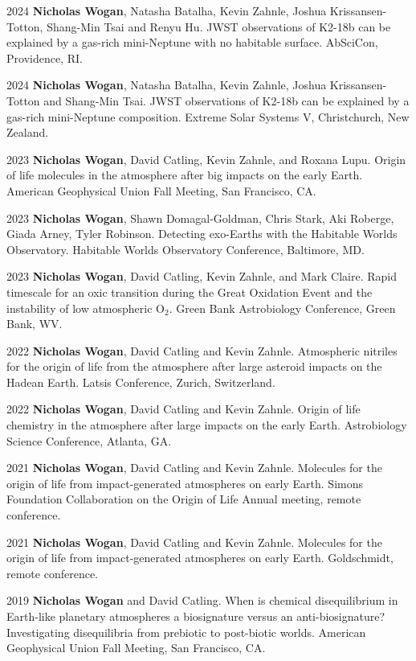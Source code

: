 \documentclass{article}
\begin{document}
\begin{cvlist}
\item[2024]
  \textbf{Nicholas Wogan}, Natasha Batalha, Kevin Zahnle, Joshua Krissansen-Totton, Shang-Min Tsai and Renyu Hu. JWST observations of K2-18b can be explained by a gas-rich mini-Neptune with no habitable surface. AbSciCon, Providence, RI.
\item[2024]
  \textbf{Nicholas Wogan}, Natasha Batalha, Kevin Zahnle, Joshua Krissansen-Totton and Shang-Min Tsai. JWST observations of K2-18b can be explained by a gas-rich mini-Neptune composition. Extreme Solar Systems V, Christchurch, New Zealand.
\item[2023]
  \textbf{Nicholas Wogan}, David Catling, Kevin Zahnle, and Roxana Lupu. Origin of life molecules in the atmosphere after big impacts on the early Earth. American Geophysical Union Fall Meeting, San Francisco, CA.
\item[2023]
  \textbf{Nicholas Wogan}, Shawn Domagal-Goldman, Chris Stark, Aki Roberge, Giada Arney, Tyler Robinson. Detecting exo-Earths with the Habitable Worlds Observatory. Habitable Worlds Observatory Conference, Baltimore, MD.
\item[2023]
  \textbf{Nicholas Wogan}, David Catling, Kevin Zahnle, and Mark Claire. Rapid timescale for an oxic transition during the Great Oxidation Event and the instability of low atmospheric O$_2$. Green Bank Astrobiology Conference, Green Bank, WV.
\item[2022]
  \textbf{Nicholas Wogan}, David Catling and Kevin Zahnle. Atmospheric nitriles for the origin of life from the atmosphere after large asteroid impacts on the Hadean Earth. Latsis Conference, Zurich, Switzerland.
\item[2022]
  \textbf{Nicholas Wogan}, David Catling and Kevin Zahnle. Origin of life chemistry in the atmosphere after large impacts on the early Earth. Astrobiology Science Conference, Atlanta, GA.
\item[2021]
  \textbf{Nicholas Wogan}, David Catling and Kevin Zahnle. Molecules for the origin of life from impact-generated atmospheres on early Earth. Simons Foundation Collaboration on the Origin of Life Annual meeting, remote conference.
\item[2021]
  \textbf{Nicholas Wogan}, David Catling and Kevin Zahnle. Molecules for the origin of life from impact-generated atmospheres on early Earth. Goldschmidt, remote conference.
\item[2019]
  \textbf{Nicholas Wogan} and David Catling. When is chemical disequilibrium in Earth-like planetary atmospheres a biosignature versus an anti-biosignature? Investigating disequilibria from prebiotic to post-biotic worlds. American Geophysical Union Fall Meeting, San Francisco, CA.
\end{cvlist}
\end{document}
